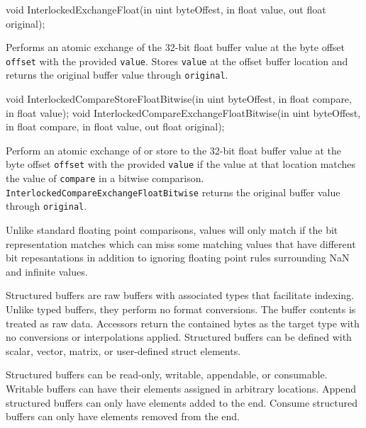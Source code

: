 \begin{HLSL}
   void InterlockedExchangeFloat(in uint byteOffest, in float value,
                                  out float original);
\end{HLSL}

Performs an atomic exchange of
the 32-bit float buffer value at the byte offset \texttt{offset} with the provided \texttt{value}.
Stores \texttt{value} at the offset buffer location
and returns the original buffer value through \texttt{original}.


\begin{HLSL}
  void InterlockedCompareStoreFloatBitwise(in uint byteOffest, in float compare,
                                            in float value);
  void InterlockedCompareExchangeFloatBitwise(in uint byteOffest,
                                               in float compare,
                                               in float value,
                                               out float original);
\end{HLSL}

Perform an atomic exchange of or store to
the 32-bit float buffer value at the byte offset \texttt{offset} with the provided \texttt{value}
if the value at that location matches the value of \texttt{compare} in a bitwise comparison.
\texttt{InterlockedCompareExchangeFloatBitwise} returns the original buffer value through \texttt{original}.

Unlike standard floating point comparisons, values will only match if the bit
representation matches which can miss some matching values that have different
bit repesantations in addition to ignoring floating point rules surrounding NaN
and infinite values.


Structured buffers are raw buffers with associated types that facilitate
indexing.
Unlike typed buffers, they perform no format conversions.
The buffer contents is treated as raw data.
Accessors return the contained bytes as the target type with no conversions or interpolations applied.
Structured buffers can be defined with scalar, vector, matrix, or user-defined
struct elements.

Structured buffers can be read-only, writable, appendable, or consumable.
Writable buffers can have their elements assigned in arbitrary locations.
Append structured buffers can only have elements added to the end.
Consume structured buffers can only have elements removed from the end.

